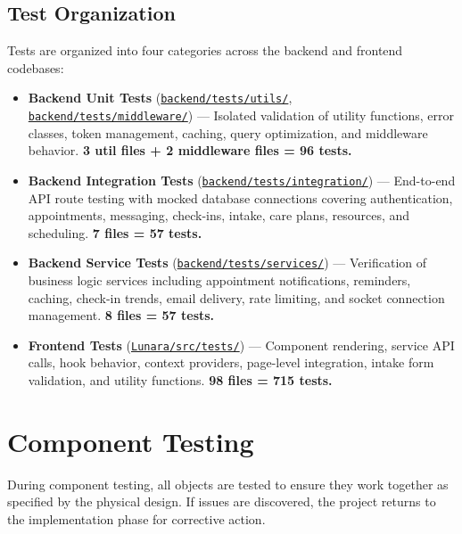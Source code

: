\documentclass[12pt,letterpaper]{article}
\newcommand{\ghrepo}{https://github.com/omniV1/lunaraCare}
\begin{document}
\subsection{Test Organization}

Tests are organized into four categories across the backend and frontend codebases:

\begin{itemize}
  \item \textbf{Backend Unit Tests} (\href{\ghrepo/tree/main/backend/tests/utils}{\texttt{backend/tests/utils/}}, \href{\ghrepo/tree/main/backend/tests/middleware}{\texttt{backend/tests/middleware/}}) --- Isolated validation of utility functions, error classes, token management, caching, query optimization, and middleware behavior. \textbf{3 util files + 2 middleware files = 96 tests.}
  \item \textbf{Backend Integration Tests} (\href{\ghrepo/tree/main/backend/tests/integration}{\texttt{backend/tests/integration/}}) --- End-to-end API route testing with mocked database connections covering authentication, appointments, messaging, check-ins, intake, care plans, resources, and scheduling. \textbf{7 files = 57 tests.}
  \item \textbf{Backend Service Tests} (\href{\ghrepo/tree/main/backend/tests/services}{\texttt{backend/tests/services/}}) --- Verification of business logic services including appointment notifications, reminders, caching, check-in trends, email delivery, rate limiting, and socket connection management. \textbf{8 files = 57 tests.}
  \item \textbf{Frontend Tests} (\href{\ghrepo/tree/main/Lunara/src/tests}{\texttt{Lunara/src/tests/}}) --- Component rendering, service API calls, hook behavior, context providers, page-level integration, intake form validation, and utility functions. \textbf{98 files = 715 tests.}
\end{itemize}

\section{Component Testing}

During component testing, all objects are tested to ensure they work together as specified by the physical design. If issues are discovered, the project returns to the implementation phase for corrective action.
\end{document}
